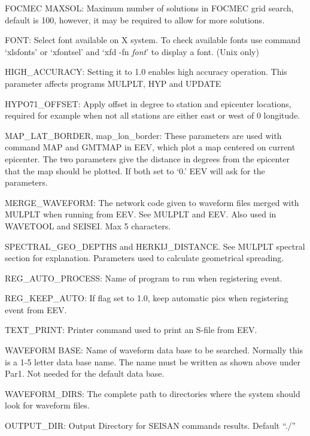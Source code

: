 FOCMEC MAXSOL: Maximum number of solutions in FOCMEC grid search, default is 100, however, 
it may be required to allow for more solutions.

FONT: Select font available on X system. To check available fonts use command `xlsfonts' or `xfontsel' and `xfd -fn \textit{font}' to display a font. (Unix only) 

HIGH\_ACCURACY: Setting it to 1.0 enables high accuracy operation. This parameter affects programs 
MULPLT, HYP and UPDATE

HYPO71\_OFFSET: Apply offset in degree to station and epicenter locations, required for example when not all stations are either east or west of 0 longitude. 

MAP\_LAT\_BORDER, map\_lon\_border: These parameters are used with command MAP and GMTMAP in EEV, which plot a map centered on current epicenter. The two parameters give the distance in degrees from the epicenter that the map should be plotted. If both set to `0.' EEV will ask for the parameters. 

MERGE\_WAVEFORM: The network code given to waveform files merged with MULPLT when running 
from EEV. See MULPLT and EEV. Also used in WAVETOOL and SEISEI. Max 5 characters.

SPECTRAL\_GEO\_DEPTHS and HERKIJ\_DISTANCE. See MULPLT spectral section for explanation. Parameters used to calculate geometrical spreading. 

REG\_AUTO\_PROCESS: Name of program to run when registering event.

REG\_KEEP\_AUTO: If flag set to 1.0, keep automatic pics when registering event from EEV.  

TEXT\_PRINT: Printer command used to print an S-file from EEV.

WAVEFORM BASE: Name of waveform data base to be searched. Normally this is a 1-5 letter data base name. The name must be written as shown above under Par1. Not needed for the default data base. 

WAVEFORM\_DIRS: The complete path to directories where the system should look for waveform files.

OUTPUT\_DIR: Output Directory for SEISAN commands results. Default ``./''

